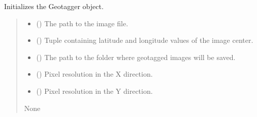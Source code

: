 \documentclass[letterpaper,10pt,english]{sphinxmanual}
\begin{document}
\begin{fulllineitems}
\label{\detokenize{index:georef.Geotagger.__init__}}
\pysigstartsignatures
{}
\pysigstopsignatures
\sphinxAtStartPar
Initializes the Geotagger object.
\begin{quote}\begin{description}
\begin{itemize}
\item {} 
\sphinxAtStartPar
{} () \textendash{} The path to the image file.

\item {} 
\sphinxAtStartPar
{} () \textendash{} Tuple containing latitude and longitude values of the image center.

\item {} 
\sphinxAtStartPar
{} () \textendash{} The path to the folder where geotagged images will be saved.

\item {} 
\sphinxAtStartPar
{} () \textendash{} Pixel resolution in the X direction.

\item {} 
\sphinxAtStartPar
{} () \textendash{} Pixel resolution in the Y direction.

\end{itemize}

\sphinxAtStartPar
None

\end{description}\end{quote}

\end{fulllineitems}

\end{document}
